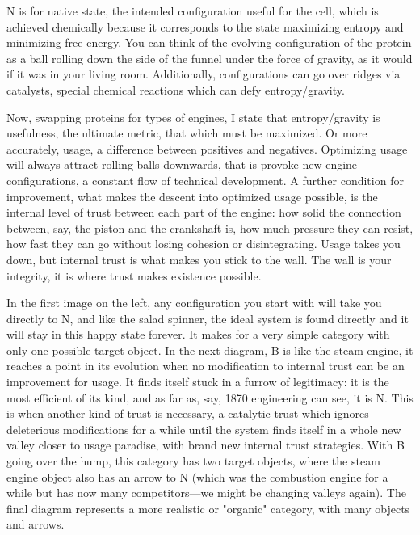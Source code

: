 \documentclass[11pt]{article}
\begin{document}
N is for native state, the intended configuration useful for the cell, which is achieved
chemically because it corresponds to the state maximizing entropy and minimizing free
energy. You can think of the evolving configuration of the protein as a ball rolling
down the side of the funnel under the force of gravity, as it would if it was in your
living room. Additionally, configurations can go over ridges via catalysts, special
chemical reactions which can defy entropy/gravity.

Now, swapping proteins for types of engines, I state that entropy/gravity is usefulness,
the ultimate metric, that which must be maximized. Or more accurately, usage, a
difference between positives and negatives. Optimizing usage will always attract rolling
balls downwards, that is provoke new engine configurations, a constant flow of technical
development. A further condition for improvement, what makes the descent into optimized
usage possible, is the internal level of trust between each part of the engine: how
solid the connection between, say, the piston and the crankshaft is, how much pressure
they can resist, how fast they can go without losing cohesion or disintegrating. Usage
takes you down, but internal trust is what makes you stick to the wall. The wall is your
integrity, it is where trust makes existence possible.

In the first image on the left, any configuration you start with will take you directly
to N, and like the salad spinner, the ideal system is found directly and it will stay in
this happy state forever. It makes for a very simple category with only one possible
target object. In the next diagram, B is like the steam engine, it reaches a point in
its evolution when no modification to internal trust can be an improvement for usage. It
finds itself stuck in a furrow of legitimacy: it is the most efficient of its kind, and
as far as, say, 1870 engineering can see, it is N. This is when another kind of trust is
necessary, a catalytic trust which ignores deleterious modifications for a while until
the system finds itself in a whole new valley closer to usage paradise, with brand new
internal trust strategies. With B going over the hump, this category has two target
objects, where the steam engine object also has an arrow to N (which was the combustion
engine for a while but has now many competitors---we might be changing valleys again).
The final diagram represents a more realistic or "organic" category, with many objects
and arrows.
\end{document}
